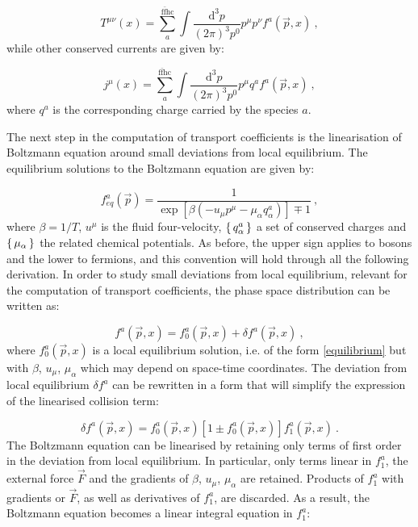 \begin{equation}
T^{\mu\nu}(x) = \sum_a^{\mathrm{f \bar f h c}} \int \frac{\mathrm d^3 p}{(2 \pi)^3 p^0} p^{\mu} p^{\nu} f^a(\vec p, x) \: ,
\label{Tmunu_kinetic}
\end{equation}
%
while other conserved currents are given by:

\begin{equation}
j^{\mu}(x) = \sum_a^{\mathrm{f \bar f h c}}\int \frac{\mathrm d^3 p}{(2 \pi)^3 p^0} p^{\mu} q^a f^a(\vec p, x) \: ,
\label{jmu_kinetic}
\end{equation}
%
where $q^a$ is the corresponding charge carried by the species $a$.



The next step in the computation of transport coefficients is the linearisation of Boltzmann equation around small deviations from local equilibrium. The equilibrium solutions to the Boltzmann equation are given by:

\begin{equation}
f^a_{eq}(\vec p) = \frac{1}{\exp[\beta(- u_{\mu}p^{\mu} - \mu_{\alpha}q_{\alpha}^a)] \mp 1} \: ,
\label{equilibrium}
\end{equation}
%
where $\beta = 1/T$, $u^{\mu}$ is the fluid four-velocity, $\set{q^a_{\alpha}}$ a set of conserved charges and $\set{\mu_{\alpha}}$ the related chemical potentials. As before, the upper sign applies to bosons and the lower to fermions, and this convention will hold through all the following derivation. In order to study small deviations from local equilibrium, relevant for the computation of transport coefficients, the phase space distribution can be written as:

\begin{equation}
f^a(\vec p, x) = f_0^a(\vec p, x) + \delta f^a (\vec p, x) \: ,
\end{equation}
%
where $f_0^a(\vec p, x)$ is a local equilibrium solution, i.e. of the form \ref{equilibrium} but with $\beta$, $u_{\mu}$, $\mu_{\alpha}$ which may depend on space-time coordinates. The deviation from local equilibrium $\delta f^a$ can be rewritten in a form that will simplify the expression of the linearised collision term:

\begin{equation}
 \delta f^a (\vec p, x)= f_0^a(\vec p, x) [1 \pm f_0^a(\vec p, x)] f_1^a(\vec p, x) \: .
\end{equation}
%
The Boltzmann equation can be linearised by retaining only terms of first order in the deviation from local equilibrium. In particular, only terms linear in $f^a_1$, the external force $\vec F$ and the gradients of $\beta$, $u_{\mu}$, $\mu_{\alpha}$ are retained. Products of $f^a_1$ with gradients or $\vec F$, as well as derivatives of $f^a_1$, are discarded. As a result, the Boltzmann equation becomes a linear integral equation in $f^a_1$:

